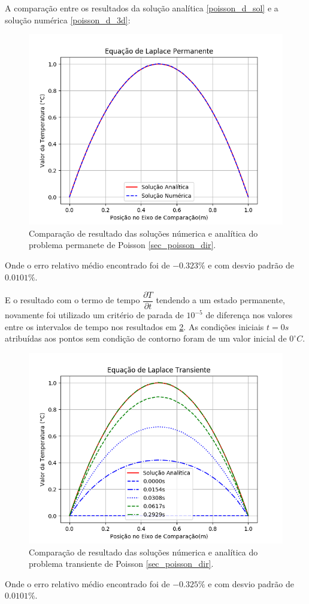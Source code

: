 A comparação entre os resultados da solução analítica \ref{poisson_d_sol} e a solução numérica \ref{poisson_d_3d}:
\begin{figure}[H]
    \centering
    \includegraphics[width=.7\linewidth]{figures/poisson_dirichlet_permanent_comparison.png}
    \caption{Comparação de resultado das soluções númerica e analítica do problema permanete de Poisson \ref{sec_poisson_dir}.}
    \label{poisson_d_perm_comp}
\end{figure}
Onde o erro relativo médio encontrado foi de $-0.323\%$ e com desvio padrão de $0.0101\%$.

E o resultado com o termo de tempo $\dfrac{\partial T}{\partial t}$ tendendo a um estado permanente, novamente foi utilizado um critério de parada de $10^{-5}$ de diferença nos valores entre os intervalos de tempo nos resultados em \ref{poisson_d_trans_comp}.
As condições iniciais $t=0s$ atribuídas aos pontos sem condição de contorno foram de um valor inicial de $0^{\circ}C$.

\begin{figure}[H]
    \centering
    \includegraphics[width=.7\linewidth]{figures/poisson_dirichlet_transient_comparison.png}
    \caption{Comparação de resultado das soluções númerica e analítica do problema transiente de Poisson \ref{sec_poisson_dir}.}
    \label{poisson_d_trans_comp}
\end{figure}
Onde o erro relativo médio encontrado foi de $-0.325\%$ e com desvio padrão de $0.0101\%$.


